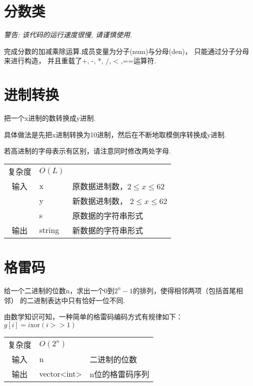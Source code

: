 \section{分数类}\small
{\it{ 警告: 该代码的运行速度很慢, 请谨慎使用.}}

完成分数的加减乘除运算.成员变量为分子(num)与分母(den)，
只能通过分子分母来进行构造，
并且重载了+, -, *, /, < ,==运算符.



\section{进制转换}\small
把一个x进制的数转换成y进制.

具体做法是先把x进制转换为10进制，然后在不断地取模倒序转换成y进制.

若高进制的字母表示有区别，请注意同时修改两处字母.
\begin{longtable}{|c|l|l|}
复杂度 & $O(L)$ &  \\
输入 & x & 原数据进制数，$2 \leq x \leq 62$ \\
 & y & 新数据进制数， $2 \leq x \leq 62$ \\
 & s & 原数据的字符串形式 \\
输出 & string & 新数据的字符串形式 \\
\end{longtable}



\section{格雷码}\small
给一个二进制的位数n，求出一个0到$2^n-1$的排列，使得相邻两项（包括首尾相邻）
的二进制表达中只有恰好一位不同.

由数学知识可知，一种简单的格雷码编码方式有规律如下：$g[i] = i \text{xor} (i >> 1)$

\begin{longtable}{|c|l|l|}
复杂度 & $O(2^{n})$ & \\
输入 & n & 二进制的位数 \\
输出 & vector<int> & n位的格雷码序列 \\
\end{longtable}
